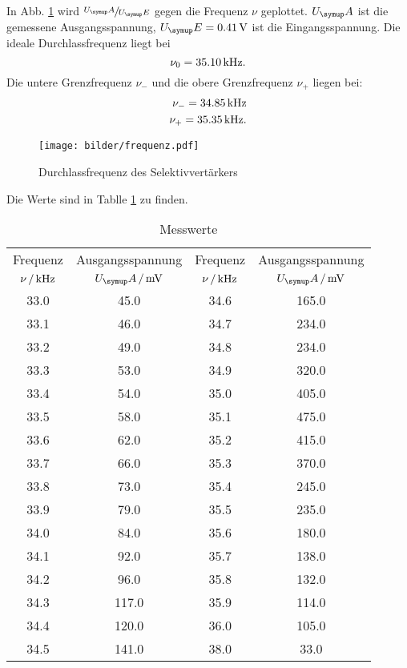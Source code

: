 In Abb. \ref{fig:Durchlass} wird $\sfrac{U_\su{A}}{U_\su{E}}$ gegen die Frequenz
$\nu$ geplottet. $U_\su{A}$ ist die gemessene Ausgangsspannung, $U_\su{E} = 0.41\,\si{\volt}$
ist die Eingangsspannung.
Die ideale Durchlassfrequenz liegt bei
\begin{equation}
  \nu_0 = 35.10 \,\si{\kilo\hertz}.
\end{equation}
Die untere Grenzfrequenz $\nu_-$ und die obere Grenzfrequenz $\nu_+$ liegen bei:
\begin{align}
  \nu_- = 34.85 \,\si{\kilo\hertz} \\
  \nu_+ = 35.35 \,\si{\kilo\hertz}.
\end{align}
\begin{figure}
  \centering
  \texttt{[image: bilder/frequenz.pdf]}
  \caption{Durchlassfrequenz des Selektivvertärkers}
  \label{fig:Durchlass}
\end{figure}
Die Werte sind in Tablle \ref{tab:werte} zu finden.
\newpage
\begin{table}
  \centering
  \begin{tabular}{cc|cc}
    \toprule
    \multicolumn{1}{c}{Frequenz} & \multicolumn{1}{c|}{Ausgangsspannung} &
    \multicolumn{1}{c}{Frequenz} & \multicolumn{1}{c}{Ausgangsspannung} \\
    {$\nu\,/\,\si{\kilo\hertz}$} & {$U_\su{A}\,/\mV$}& {$\nu\,/\,\si{\kilo\hertz}$} & {$U_\su{A}\,/\mV$} \\
    \midrule
       33.0 &   45.0 & 34.6  &   165.0 \\
       33.1 &   46.0 & 34.7  &   234.0 \\
       33.2 &   49.0 & 34.8  &   234.0 \\
       33.3 &   53.0 & 34.9  &   320.0 \\
       33.4 &   54.0 & 35.0  &   405.0 \\
       33.5 &   58.0 & 35.1  &   475.0 \\
       33.6 &   62.0 & 35.2  &   415.0 \\
       33.7 &   66.0 & 35.3  &   370.0 \\
       33.8 &   73.0 & 35.4  &   245.0 \\
       33.9 &   79.0 & 35.5  &   235.0 \\
       34.0 &   84.0 & 35.6  &   180.0 \\
       34.1 &   92.0 & 35.7  &   138.0 \\
       34.2 &   96.0 & 35.8  &   132.0 \\
       34.3 &  117.0 & 35.9  &   114.0 \\
       34.4 &  120.0 & 36.0  &   105.0 \\
       34.5 &  141.0 & 38.0  &    33.0 \\
  \bottomrule
  \end{tabular}
  \caption{Messwerte}
  \label{tab:werte}
\end{table}
